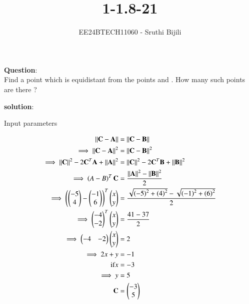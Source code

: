 \documentclass[journal]{IEEEtran}
\begin{document}

\vspace{3cm}

\title{1-1.8-21}
\author{EE24BTECH11060 - Sruthi Bijili}
{\let\newpage\relax\maketitle}

\renewcommand{\thefigure}{\theenumi}
\renewcommand{\thetable}{\theenumi}
\setlength{\intextsep}{10pt} %


\renewcommand{\thetable}{\theenumi}

\textbf{Question}:\\
Find a point which is equidistant from the points  and . How many such points are there ?

\textbf{solution}:\\
\begin{table}[h!]    
  \centering
  
  \caption{Input parameters}
  \label{tab1.1.8.21}
\end{table}
\begin{align}
\left\vert\left\vert\mathbf{C}-\mathbf{A}\right\vert\right\vert&=\left\vert\left\vert\mathbf{C}-\mathbf{B}\right\vert\right\vert\\
\implies\left\vert\left\vert\mathbf{C}-\mathbf{A}\right\vert\right\vert^2&=\left\vert\left\vert\mathbf{C}-\mathbf{B}\right\vert\right\vert^2\\
\implies\left\vert\left\vert\mathbf{C}\right\vert\right\vert^2-2\mathbf{C}^T\mathbf{A}+\left\vert\left\vert\mathbf{A}\right\vert\right\vert^2&=\left\vert\left\vert\mathbf{C}\right\vert\right\vert^2-2\mathbf{C}^T\mathbf{B}+\left\vert\left\vert\mathbf{B}\right\vert\right\vert^2\\
\implies\left(A-B\right)^T\mathbf{C}&=\frac{\left\vert\left\vert\mathbf{A}\right\vert\right\vert^2-\left\vert\left\vert\mathbf{B}\right\vert\right\vert^2}{2}\\
\implies\left({\begin{pmatrix}-5 \\ 4\end{pmatrix}}-{\begin{pmatrix}-1 \\ 6\end{pmatrix}}\right)^T\begin{pmatrix}x \\ y\end{pmatrix}&=\frac{\sqrt{\left(-5\right)^2+\left(4\right)^2}-\sqrt{\left(-1\right)^2+\left(6\right)^2}}{2}\\
\implies\begin{pmatrix}-4 \\-2\end{pmatrix}^T\begin{pmatrix}x \\ y\end{pmatrix}&=\frac{41-37}{2}\\
\implies\begin{pmatrix}-4 &-2\end{pmatrix}\begin{pmatrix}x \\ y\end{pmatrix}&=2\\
\implies 2x+y&=-1\\
\text{if} x&=-3\\
\implies y&=5\\
\mathbf{C}&=\begin{pmatrix}-3 \\ 5\end{pmatrix}
\end{align}
\end{document}
